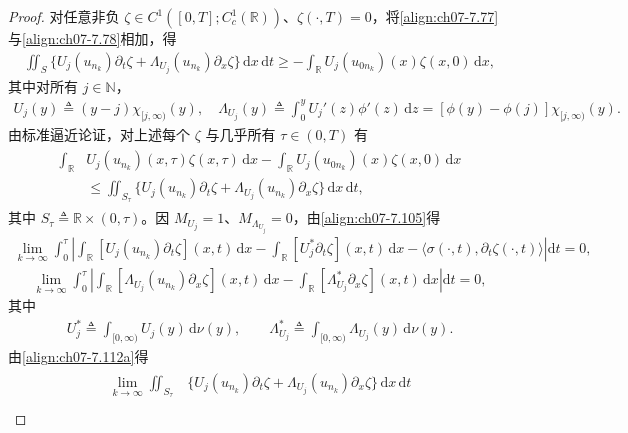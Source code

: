 \documentclass[../../main.tex]{subfiles}%
\begin{document}
\begin{proof}
对任意非负 $\zeta\in C^1([0,T];C^1_c(\mathbb{R}))$、$\zeta(\cdot,T)=0$，将\eqref{align:ch07-7.77}与\eqref{align:ch07-7.78}相加，得
\begin{align*}
\iint_S\{U_j(u_{n_k})\partial_t\zeta+\Lambda_{U_j}(u_{n_k})\partial_x\zeta\}\,\mathrm{d}x\,\mathrm{d}t
\geqslant-\int_{\mathbb{R}}U_j(u_{0n_k})(x)\zeta(x,0)\,\mathrm{d}x,
\end{align*}
其中对所有 $j\in\mathbb{N}$，
\begin{align}
U_j(y)\triangleq (y-j)\chi_{[j,\infty)}(y),\quad
\Lambda_{U_j}(y)\triangleq \int_0^y U_j'(z)\phi'(z)\,\mathrm{d}z=[\phi(y)-\phi(j)]\chi_{[j,\infty)}(y). \label{align:ch07-7.110}
\end{align}
由标准逼近论证，对上述每个 $\zeta$ 与几乎所有 $\tau\in(0,T)$ 有
\begin{align}
\begin{aligned}
\int_{\mathbb{R}}&U_j(u_{n_k})(x,\tau)\zeta(x,\tau)\,\mathrm{d}x-\int_{\mathbb{R}}U_j(u_{0n_k})(x)\zeta(x,0)\,\mathrm{d}x\\
&\leqslant\iint_{S_\tau}\{U_j(u_{n_k})\partial_t\zeta+\Lambda_{U_j}(u_{n_k})\partial_x\zeta\}\,\mathrm{d}x\,\mathrm{d}t,
\end{aligned} 
\label{align:ch07-7.111}
\end{align}
其中 $S_\tau\triangleq \mathbb{R}\times(0,\tau)$。因 $M_{U_j}=1$、$M_{\Lambda_{U_j}}=0$，由\eqref{align:ch07-7.105}得
\begin{align}
\lim_{k\to\infty}\int_0^\tau\left|\int_{\mathbb{R}}[U_j(u_{n_k})\partial_t\zeta](x,t)\,\mathrm{d}x
-\int_{\mathbb{R}}[U_j^*\partial_t\zeta](x,t)\,\mathrm{d}x
-\langle\sigma(\cdot,t),\partial_t\zeta(\cdot,t)\rangle\right|\mathrm{d}t=0, \label{align:ch07-7.112a}
\end{align}
\begin{align}
\lim_{k\to\infty}\int_0^\tau\left|\int_{\mathbb{R}}[\Lambda_{U_j}(u_{n_k})\partial_x\zeta](x,t)\,\mathrm{d}x
-\int_{\mathbb{R}}[\Lambda_{U_j}^*\partial_x\zeta](x,t)\,\mathrm{d}x\right|\mathrm{d}t=0, \label{align:ch07-7.112b}
\end{align}
其中
\begin{align*}
U_j^*\triangleq \int_{[0,\infty)}U_j(y)\,\mathrm{d}\nu(y),\qquad
\Lambda_{U_j}^*\triangleq \int_{[0,\infty)}\Lambda_{U_j}(y)\,\mathrm{d}\nu(y).
\end{align*}
由\eqref{align:ch07-7.112a}得
\begin{align}
\begin{aligned}
\lim_{k\to\infty}\iint_{S_\tau}&\{U_j(u_{n_k})\partial_t\zeta+\Lambda_{U_j}(u_{n_k})\partial_x\zeta\}\,\mathrm{d}x\,\mathrm{d}t\\

\end{aligned}
\end{align}
\end{proof}
\end{document}
